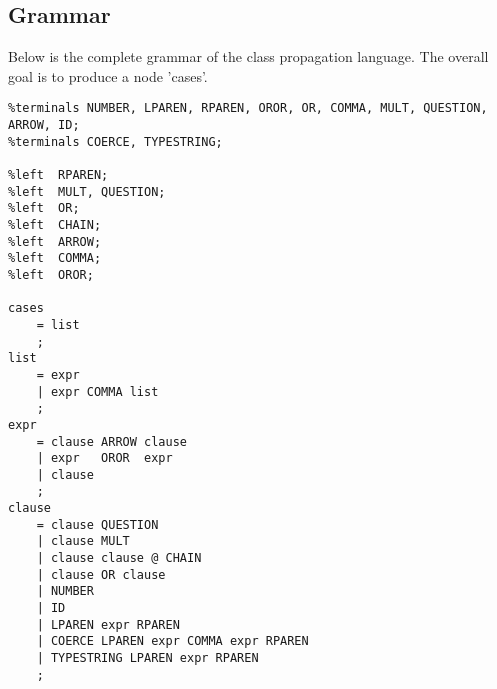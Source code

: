 


\newpage
\subsection{Grammar}
\vspace{-.2cm}
Below is the complete grammar of the class propagation language. The overall
goal is to produce a node 'cases'.
\begin{footnotesize}
\vspace{-.2cm}
\begin{verbatim}
%terminals NUMBER, LPAREN, RPAREN, OROR, OR, COMMA, MULT, QUESTION, ARROW, ID;
%terminals COERCE, TYPESTRING;

%left  RPAREN;
%left  MULT, QUESTION;
%left  OR;
%left  CHAIN;
%left  ARROW;
%left  COMMA;
%left  OROR;

cases
    = list
    ;
list
    = expr                    
    | expr COMMA list
    ;
expr 
    = clause ARROW clause
    | expr   OROR  expr   
    | clause
    ;
clause
    = clause QUESTION
    | clause MULT
    | clause clause @ CHAIN
    | clause OR clause
    | NUMBER
    | ID
    | LPAREN expr RPAREN
    | COERCE LPAREN expr COMMA expr RPAREN
    | TYPESTRING LPAREN expr RPAREN
    ;
\end{verbatim}
\end{footnotesize}
